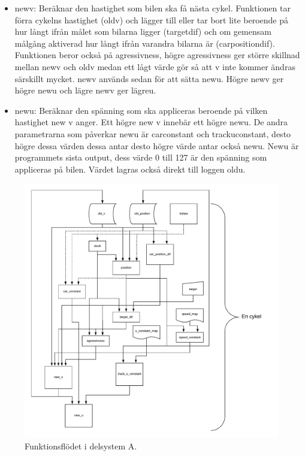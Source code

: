 \begin{itemize}
\item new\textunderscore v: Beräknar den hastighet som bilen ska få nästa cykel. Funktionen tar förra cykelns hastighet (old\textunderscore v) 
och lägger till eller tar bort lite beroende på hur långt ifrån målet som bilarna ligger (target\textunderscore dif) och om gemensam
målgång aktiverad hur långt ifrån varandra bilarna är (car\textunderscore position\textunderscore dif). Funktionen beror 
också på agressivness, högre agressivness ger större skillnad mellan new\textunderscore v och old\textunderscore v medan ett lågt värde gör så att v 
inte kommer ändras särskillt mycket.
new\textunderscore v används sedan för att sätta
new\textunderscore u. Högre new\textunderscore v ger högre new\textunderscore u och lägre new\textunderscore v ger lägre\textunderscore u. 
      \item new\textunderscore u: Beräknar den spänning som ska appliceras beroende på vilken hastighet new \textunderscore v anger. Ett högre new \textunderscore v innebär ett högre new\textunderscore u. De andra parametrarna som påverkar new\textunderscore u är car\textunderscore constant och track\textunderscore u\textunderscore constant, desto högre dessa värden dessa antar desto högre värde antar också new\textunderscore u. New\textunderscore u är programmets sista output, dess värde 0 till 127 är den spänning som appliceras på bilen. Värdet lagras också direkt till loggen old\textunderscore u. 

    \end{itemize}

    \begin{figure}
      \centering
      \includegraphics[width=\linewidth]{figures/flow.pdf}
      \caption{Funktionsflödet i delsystem A.}%
      \label{fig:flow_diagram}
    \end{figure}

